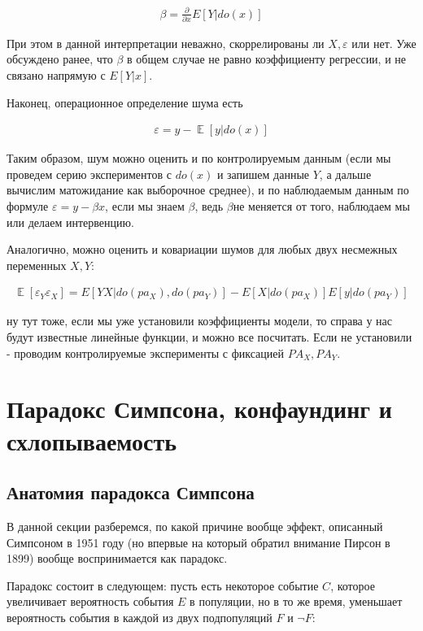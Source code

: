 \documentclass[fleqn]{article}
\DeclareMathOperator{\E}{\mathop\mathbb{E}}
\numberwithin{equation}{section}
\numberwithin{theorem}{section}
\numberwithin{figure}{section}
\numberwithin{lemma}{section}
\numberwithin{corollary}{section}
\begin{document}
\begin{align}
	\beta = \frac{\partial }{\partial x}E[Y|do(x)]
\end{align}

При этом в данной интерпретации неважно, скоррелированы ли $X,\varepsilon$ или нет. Уже обсуждено ранее, что $\beta$ в общем случае не равно коэффициенту регрессии, и не связано напрямую с $E[Y|x]$.

Наконец, операционное определение шума есть 

\begin{align}
	\varepsilon = y - \E[y|do(x)]
\end{align}

Таким образом, шум можно оценить и по контролируемым данным (если мы проведем серию экспериментов с $do(x)$ и запишем данные $Y$, а дальше вычислим матожидание как выборочное среднее), и по наблюдаемым данным по формуле $\varepsilon = y - \beta x$, если мы знаем $\beta$, ведь $\beta$не меняется от того, наблюдаем мы или делаем интервенцию. 

Аналогично, можно оценить и ковариации шумов для любых двух несмежных переменных $X,Y$:

\begin{align}
	\E[\varepsilon_Y\varepsilon_X] = E[YX|do(pa_X),do(pa_Y)] - E[X|do(pa_X)]E[y|do(pa_Y)]
\end{align}

ну тут тоже, если мы уже установили коэффициенты модели, то справа у нас будут известные линейные функции, и можно все посчитать. Если не установили - проводим контролируемые эксперименты с фиксацией $PA_X,PA_Y$.

\section{Парадокс Симпсона, конфаундинг и схлопываемость}

\subsection*{Анатомия парадокса Симпсона}

В данной секции разберемся, по какой причине вообще эффект, описанный Симпсоном в 1951 году (но впервые на который обратил внимание Пирсон в 1899) вообще воспринимается как парадокс. 

Парадокс состоит в следующем: пусть есть некоторое событие $C$, которое увеличивает вероятность события $E$ в популяции, но в то же время, уменьшает вероятность события в каждой из двух подпопуляций $F$ и $\neg F$:
\end{document}
